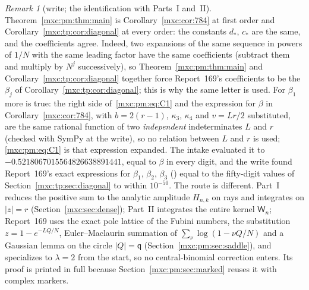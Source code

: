 \documentclass[11pt]{article}
\numberwithin{equation}{section}
\theoremstyle{definition}
\theoremstyle{remark}
\newtheorem{remark}[theorem]{Remark}
\begin{document}
\begin{remark}[write; the identification with Parts~I and~II]\label{mxc:pm:rem:identification}
Theorem~\ref{mxc:pm:thm:main} is Corollary~\ref{mxc:cor:784} at first order and
Corollary~\ref{mxc:tp:cor:diagonal} at every order: the constants $d_*$,
$c_*$ are the same, and the coefficients agree. Indeed, two expansions of the
same sequence in powers of $1/N$ with the same leading factor have the same
coefficients (subtract them and multiply by $N^j$ successively), so
Theorem~\ref{mxc:pm:thm:main} and Corollary~\ref{mxc:tp:cor:diagonal} together
force Report~169's coefficients to be the $\beta_j$ of
Corollary~\ref{mxc:tp:cor:diagonal}; this is why the same letter is used.
For $\beta_1$ more is true: the right side of~\eqref{mxc:pm:eq:C1} and the
expression for $\beta$ in Corollary~\ref{mxc:cor:784}, with $b=2(r-1)$,
$\kappa_3$, $\kappa_4$ and $v=Lr/2$ substituted, are the same rational
function of two \emph{independent} indeterminates $L$ and $r$ (checked with
SymPy at the write), so no relation between $L$ and $r$ is used;
\eqref{mxc:pm:eq:C1} is that expression expanded. The intake evaluated it to
$-0.5218067015564826638891441$, equal to $\beta$ in every digit, and the
write found Report~169's exact expressions for $\beta_1$, $\beta_2$, $\beta_3$
() equal to the
fifty-digit values of Section~\ref{mxc:tp:sec:diagonal} to within $10^{-50}$.
The route is different. Part~I reduces the positive sum to the analytic
amplitude $H_{n,k}$ on rays and integrates on $|z|=r$
(Section~\ref{mxc:sec:dense}); Part~II integrates the entire kernel
$\mathsf W_n$; Report~169 uses the exact pole lattice of the Fubini numbers,
the substitution $z=1-e^{-LQ/N}$, Euler--Maclaurin summation of
$\sum_\nu\log(1-\nu Q/N)$ and a Gaussian lemma on the circle $|Q|=\mathsf q$
(Section~\ref{mxc:pm:sec:saddle}), and specializes to $\lambda=2$ from the
start, so no central-binomial correction enters. Its proof is printed in full
because Section~\ref{mxc:pm:sec:marked} reuses it with complex markers.
\end{remark}
\end{document}
